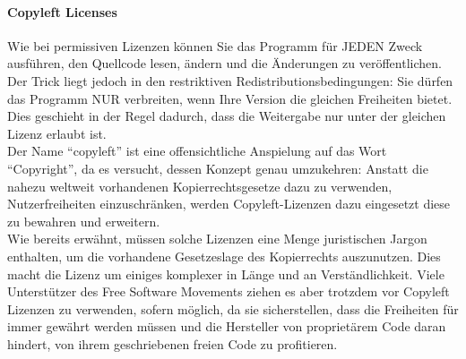 \documentclass[a4paper,11pt]{article}
\begin{document}
\paragraph{Copyleft Licenses}
Wie bei permissiven Lizenzen können Sie das Programm für JEDEN Zweck ausführen, den Quellcode lesen, ändern und die Änderungen zu veröffentlichen. Der Trick liegt jedoch in den restriktiven Redistributionsbedingungen: Sie dürfen das Programm NUR verbreiten, wenn Ihre Version die gleichen Freiheiten bietet. Dies geschieht in der Regel dadurch, dass die Weitergabe nur unter der gleichen Lizenz erlaubt ist.\\

Der Name ``copyleft'' ist eine offensichtliche Anspielung auf das Wort ``Copyright'', da es versucht, dessen Konzept genau umzukehren: Anstatt die nahezu weltweit vorhandenen Kopierrechtsgesetze dazu zu verwenden, Nutzerfreiheiten einzuschränken, werden Copyleft-Lizenzen dazu eingesetzt diese zu bewahren und erweitern.\\

Wie bereits erwähnt, müssen solche Lizenzen eine Menge juristischen Jargon enthalten, um die vorhandene Gesetzeslage des Kopierrechts auszunutzen. Dies macht die Lizenz um einiges komplexer in Länge und an Verständlichkeit. Viele Unterstützer des Free Software Movements ziehen es aber trotzdem vor Copyleft Lizenzen zu verwenden, sofern möglich, da sie sicherstellen, dass die Freiheiten für immer gewährt werden müssen und die Hersteller von proprietärem Code daran hindert, von ihrem geschriebenen freien Code zu profitieren.\\
\end{document}
